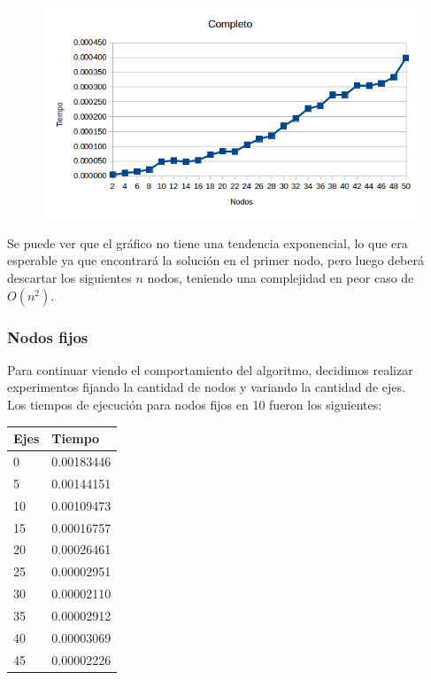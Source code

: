   \begin{figure}[h!]
   \begin{center}
 	\includegraphics[scale=0.7]{imagenes/exacto/Completos.png}
   \end{center}
 \end{figure}

Se puede ver que el gr\'afico no tiene una tendencia exponencial, lo que era esperable ya que encontrar\'a la soluci\'on en el primer nodo, pero luego deber\'a descartar los siguientes $n$ nodos,
teniendo una complejidad en peor caso de $O(n^2)$.\\

\newpage

\subsubsection{Nodos fijos}
Para continuar viendo el comportamiento del algoritmo, decidimos realizar experimentos fijando la cantidad de nodos y variando la cantidad de ejes.\\

Los tiempos de ejecuci\'on para nodos fijos en 10 fueron los siguientes:\\

\begin{tabular}{| l | l |}
  \hline
  Ejes & Tiempo \\ \hline
  0 & 0.00183446 \\ \hline
  5 & 0.00144151 \\ \hline
  10 & 0.00109473 \\ \hline
  15 & 0.00016757 \\ \hline
  20 & 0.00026461 \\ \hline
  25 & 0.00002951 \\ \hline
  30 & 0.00002110 \\ \hline
  35 & 0.00002912 \\ \hline
  40 & 0.00003069 \\ \hline
  45 & 0.00002226 \\ \hline
\end{tabular}

